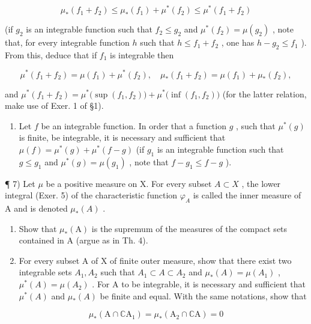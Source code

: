 \[
\mu_ {*} (f _ {1} + f _ {2}) \leqslant \mu_ {*} (f _ {1}) + \mu^ {*} (f _ {2}) \leqslant \mu^ {*} (f _ {1} + f _ {2})
\]

(if \(g_2\) is an integrable function such that \(f_2 \leqslant g_2\) and \(\mu^*(f_2) = \mu(g_2)\) , note that, for every integrable function \(h\) such that \(h \leqslant f_1 + f_2\) , one has \(h - g_2 \leqslant f_1\) ). From this, deduce that if \(f_1\) is integrable then

\[
\mu^ {*} (f _ {1} + f _ {2}) = \mu (f _ {1}) + \mu^ {*} (f _ {2}), \quad \mu_ {*} (f _ {1} + f _ {2}) = \mu (f _ {1}) + \mu_ {*} (f _ {2}),
\]

and \(\mu^{*}(f_{1} + f_{2}) = \mu^{*}\big(\sup (f_{1},f_{2})\big) + \mu^{*}\big(\inf (f_{1},f_{2})\big)\) (for the latter relation, make use of Exer. 1 of §1).

\begin{enumerate}
\def\labelenumi{\alph{enumi})}
\setcounter{enumi}{4}
\tightlist
\item
  Let \(f\) be an integrable function. In order that a function \(g\) , such that \(\mu^{*}(g)\) is finite, be integrable, it is necessary and sufficient that \(\mu(f) = \mu^{*}(g) + \mu^{*}(f - g)\) (if \(g_{1}\) is an integrable function such that \(g \leqslant g_{1}\) and \(\mu^{*}(g) = \mu(g_{1})\) , note that \(f - g_{1} \leqslant f - g\) ).
\end{enumerate}

¶ 7) Let \(\mu\) be a positive measure on X. For every subset \(A \subset X\) , the lower integral (Exer. 5) of the characteristic function \(\varphi_A\) is called the inner measure of A and is denoted \(\mu_*(A)\) .

\begin{enumerate}
\def\labelenumi{\alph{enumi})}
\item
  Show that \(\mu_{*}(\mathrm{A})\) is the supremum of the measures of the compact sets contained in A (argue as in Th. 4).
\item
  For every subset A of X of finite outer measure, show that there exist two integrable sets \(A_{1}, A_{2}\) such that \(A_{1} \subset A \subset A_{2}\) and \(\mu_{*}(A) = \mu(A_{1})\) , \(\mu^{*}(A) = \mu(A_{2})\) . For A to be integrable, it is necessary and sufficient that \(\mu^{*}(A)\) and \(\mu_{*}(A)\) be finite and equal. With the same notations, show that
\end{enumerate}

\[
\mu_ {*} (\mathrm{A} \cap \mathbb {C} \mathrm{A} _ {1}) = \mu_ {*} (\mathrm{A} _ {2} \cap \mathbb {C} \mathrm{A}) = 0
\]

